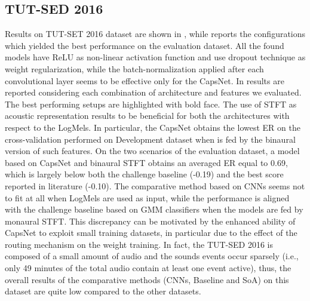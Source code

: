 \subsection{TUT-SED 2016}
Results on TUT-SET 2016 dataset are shown in , while  reports the configurations which yielded the best performance on the evaluation dataset. 
All the found models have ReLU as non-linear activation function and use dropout technique as weight regularization, while the batch-normalization applied after each convolutional layer seems to be effective only for the CapsNet. In  results are reported considering each combination of architecture and features we evaluated. The best performing setups are highlighted with bold face. The use of STFT as acoustic representation results to be beneficial for both the architectures with respect to the LogMels. In particular, the CapsNet obtains the lowest ER on the cross-validation performed on Development dataset when is fed by the binaural version of such features. On the two scenarios of the evaluation dataset, a model based on CapsNet and binaural STFT obtains an averaged ER equal to 0.69, which is largely below both the challenge baseline \cite{mesaros2016tut} (-0.19) and the best score reported in literature \cite{valenti2017neural} (-0.10). %
The comparative method based on CNNs seems not to fit at all when LogMels are used as input, while the performance is aligned with the challenge baseline based on GMM classifiers when the models are fed by monaural STFT. This discrepancy can be motivated by the enhanced ability of CapsNet to exploit small training datasets, in particular due to the effect of the routing mechanism on the weight training. In fact, the TUT-SED 2016 is composed of a small amount of audio and the sounds events occur sparsely (i.e., only 49 minutes of the total audio contain at least one event active), thus, the overall results of the comparative methods (CNNs, Baseline and SoA) on this dataset are quite low compared to the other datasets. 

